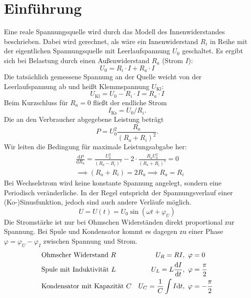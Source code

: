 \section{Einführung}
Eine reale Spannungsquelle wird durch das Modell des Innenwiderstandes beschrieben. Dabei wird gerechnet, als wäre ein Innenwiderstand $R_i$ in Reihe mit der eigentlichen Spannungsquelle mit Leerlaufspannung $U_0$ geschaltet. Es ergibt sich bei Belastung durch einen Außenwiderstand $R_a$ (Strom $I$):
\begin{equation}
  U_0=R_i\cdot I+R_a\cdot I
  \label{eq:innenwiderstand}
\end{equation}
Die tatsächlich gemessene Spannung an der Quelle weicht von der Leerlaufspannung ab und heißt Klemmspannung $U_{\text{Kl}}$:
\begin{equation}
  U_{\text{Kl}}=U_0-R_i\cdot I=R_a\cdot I
  \label{eq:klemmspannung}
\end{equation}
Beim Kurzschluss für $R_a=0$ fließt der endliche Strom
\begin{equation}
  I_{\text{Ks}}=U_0/R_i.
  \label{eq:kurzschluss}
\end{equation}
Die an den Verbraucher abgegebene Leistung beträgt
\begin{equation}
  P=U_0^2 \frac{R_a}{(R_a+R_i)^2}.
  \label{eq:leistung}
\end{equation}
Wir leiten die Bedingung für maximale Leistungsabgabe her:
\begin{align}
  &\frac{\mathrm{d}P}{\mathrm{d}R_a}=\frac{U_0^2}{(R_a-R_i)^2}-2\cdot \frac{R_a U_0^2}{(R_a+R_i)^3}=0 \\
  &\implies (R_a+R_i)=2R_a \implies R_a=R_i
  \label{eq:maxleistung}
\end{align}
Bei Wechselstrom wird keine konstante Spannung angelegt, sondern eine Periodisch veränderliche. In der Regel entspricht der Spannungsverlauf einer (Ko-)Sinusfunktion, jedoch sind auch andere Verläufe möglich. 
\begin{equation}
	U = U(t) = U_0 \sin(\omega t + \varphi_U)
\end{equation}
Die Stromstärke ist nur bei Ohmschen Widerständen direkt proportional zur Spannung. Bei Spule und Kondensator kommt es dagegen zu einer Phase $ \varphi = \varphi_U - \varphi_I $ zwischen Spannung und Strom.
\begin{align}
	&\text{Ohmscher Widerstand } R & U_R = R I&,~\varphi = 0 \\
	&\text{Spule mit Induktivität } L & U_L = L \frac{\mathrm{d} I}{\mathrm{d} t}&,~\varphi= \frac{\pi}{2} \\
	&\text{Kondensator mit Kapazität } C & U_C = \frac{1}{C} \int I \mathrm{d} t&,~\varphi = -\frac{\pi}{2}
\end{align}

